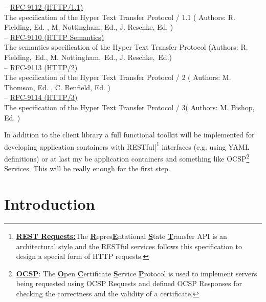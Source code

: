 \documentclass[10pt,a4paper,english]{article}
\begin{document}
\begin{flushleft}
\hspace*{1em}-- \href{https://www.rfc-editor.org/rfc/rfc9112.pdf}{RFC-9112 (HTTP/1.1)}\\The specification of the Hyper Text Transfer Protocol / 1.1 ( Authors: R. Fielding, Ed. , M. Nottingham, Ed.,  J. Reschke, Ed. ) \\
\hspace*{1em}-- \href{https://www.rfc-editor.org/rfc/rfc9110.pdf}{RFC-9110 (HTTP Semantics)} \\The semantics specification of the Hyper Text Transfer Protocol (Authors: R. Fielding, Ed., M. Nottingham, Ed., J. Reschke, Ed.)\\
\hspace*{1em}-- \href{https://www.rfc-editor.org/rfc/rfc9113.pdf}{RFC-9113 (HTTP/2)} \\The specification of the Hyper Text Transfer Protocol / 2 ( Authors:             M. Thomson, Ed. , C. Benfield, Ed. )\\
\hspace*{1em}-- \href{https://www.rfc-editor.org/rfc/rfc9114.pdf}{RFC-9114 (HTTP/3)} \\The specification of the Hyper Text Transfer Protocol / 3( Authors: M. Bishop, Ed. ) \\
\end{flushleft}\begin{flushleft}
In addition to the client library a full  functional toolkit will be implemented for developing application containers with RESTful|\footnote{\textbf{\underline {REST Requests:}}The \textbf{\underline {R}}epres\textbf{\underline {E}}ntational \textbf{\underline {S}}tate \textbf{\underline {T}}ransfer API is an architectural style and the RESTful services follows this specification to design a special form of HTTP requests.} interfaces (e.g. using YAML definitions) or at last my be application containers and something like OCSP\footnote{\textbf{\underline {OCSP}}: The \textbf{\underline {O}}pen \textbf{\underline {C}}ertificate \textbf{\underline {S}}ervice \textbf{\underline {P}}rotocol is used to implement servers being requested using OCSP Requests and defined OCSP  Responses for checking the correctness and the validity of a certificate.} Services.
This will be really enough for the first step.
\end{flushleft}

\section{Introduction}
\end{document}
